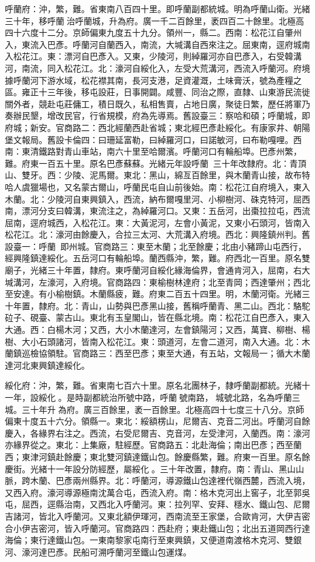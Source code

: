 \begin{pinyinscope}
呼蘭府：沖，繁，難。省東南八百四十里。即呼蘭副都統城。明為呼蘭山衛。光緒三十年，移呼蘭治呼蘭城，升為府。廣一千二百餘里，袤四百二十餘里。北極高四十六度十二分。京師偏東九度五十九分。領州一，縣二。西南：松花江自肇州入，東流入巴彥。呼蘭河自蘭西入，南流，大堿溝自西來注之。屈東南，逕府城南入松花江。東：漂河自巴彥入。又東，少陵河，則綽羅河亦自巴彥入，右受韓溝河，南流，同入松花江。北：濠河自綏化入，左受大荒溝河，西流入呼蘭河。府境據呼蘭河下游水域，松花襟其南，長河支港，足資灌溉，土味膏沃，號為產糧之區。雍正十三年後，移屯設莊，日事開闢。咸豐、同治之際，直隸、山東游民流徙關外者，競赴屯莊傭工，積日既久，私相售賣，占地日廣，聚徒日繁，歷任將軍乃奏辦民墾，增改民官，行省規模，府為先導焉。舊設臺三：察哈和碩；呼蘭城，即府城；新安。官商路二：西北經蘭西赴省城；東北經巴彥赴綏化。有康家井、朝陽堡文報局。舊設卡倫四：曰珊延富勒，曰綽羅河口，曰諾敏河，曰布勒嘎哩。西南：東清鐵路對青山車站，南六十里至哈爾濱。呼蘭河口有輪船埠。巴彥州繁，難。府東一百五十里。原名巴彥蘇蘇。光緒元年設呼蘭，三十年改隸府。北：青頂山、雙牙。西：少陵、泥馬爾。東北：黑山，綿亙百餘里，與木蘭青山接，故布特哈人虞獵場也，又名蒙古爾山，呼蘭民屯自山前後始。南：松花江自府境入，東入木蘭。北：少陵河自東興鎮入，西流，納布爾嘎里河、小柳樹河、硃克特河，屈西南，漂河分支曰韓溝，東流注之，為綽羅河口。又東：五岳河，出棗拉拉屯，西流屈南，逕府城西，入松花江。東：大黃泥河，左會小黃泥，又東小石頭河，皆南入松花江。北：濠河由餘慶入，合拉三太河、大荒溝入府境。西北：興隆鎮州判。舊設臺一：呼蘭，即州城。官商路三：東至木蘭；北至餘慶；北由小豬蹄山屯西行，經興隆鎮達綏化。五岳河口有輪船埠。蘭西縣沖，繁，難。府西北一百里。原名雙廟子，光緒三十年置，隸府。東呼蘭河自綏化緣海倫界，會通肯河入，屈南，右大堿溝河，左濠河，入府境。官商路四：東榆樹林達府；北至青岡；西達肇州；西北至安達。有小榆樹鎮。木蘭縣疲，難。府東二百五十四里。明，木蘭河衛。光緒三十年置，隸府。北：青山，山勢與巴彥黑山接，舊稱呼蘭青、黑二山。西北：駱駝砬子、硯臺、蒙古山。東北有玉皇閣山，皆在縣北境。南：松花江自巴彥入，東入大通。西：白楊木河；又西，大小木蘭達河，左會鎮陽河；又西，萬寶、柳樹、楊樹、大小石頭諸河，皆南入松花江。東：頭道河，左會二道河，南入大通。北：木蘭鎮巡檢協領駐。官商路三：西至巴彥；東至大通，有五站，文報局一；循大木蘭達河北東興鎮達綏化。

綏化府：沖，繁，難。省東南七百六十里。原名北團林子，隸呼蘭副都統。光緒十一年，設綏化。是時副都統治所號中路，呼蘭號南路，城號北路，名為呼蘭三城。三十年升為府。廣三百餘里，袤一百餘里。北極高四十七度三十八分。京師偏東十度五十六分。領縣一。東北：綏額楞山，尼爾吉、克音二河出。呼蘭河自餘慶入，各緣界右注之。西流，右受尼爾吉、克音河，左受津河，入蘭西。南：濠河亦緣界從之。東北：上集廠，駐經歷。官商路五：北赴海倫；南出巴彥；西至蘭西；東津河鎮赴餘慶；東北雙河鎮達鐵山包。餘慶縣繁，難。府東一百里。原名餘慶街。光緒十一年設分防經歷，屬綏化。三十年改置，隸府。南：青山、黑山山脈，跨木蘭、巴彥兩州縣界。北：呼蘭河，導源鐵山包達裡代嶺西麓，西流入境，又西入府。濠河導源極南沈萬合屯，西流入府。南：格木克河出上窖子，北至郭吳屯，屈西，逕縣治南，又西北入呼蘭河。東：拉列罕、安拜、穩水、鐵山包、尼爾吉諸河，皆北入呼蘭河。又東北額伊琿河，西南流至王家堡，合歐肯河，大伊吉密合小伊吉密河，皆入呼蘭河。官商路四：西赴府；東赴鐵山包；北出五道岡西行達海倫；東行達鐵山包。一東南黎家屯南行至東興鎮，又便道南渡格木克河、雙銀河、濠河達巴彥。民船可溯呼蘭河至鐵山包運煤。


\end{pinyinscope}
